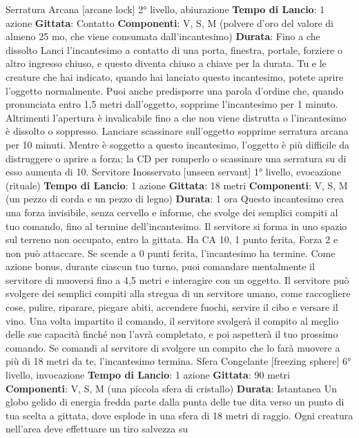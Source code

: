 \begin{multicols}{2}
Serratura Arcana
[arcane lock]
2° livello, abiurazione
\textbf{Tempo di Lancio}: 1 azione
\textbf{Gittata}: Contatto
\textbf{Componenti}: V, S, M (polvere d’oro del valore di
almeno 25 mo, che viene consumata dall’incantesimo)
\textbf{Durata}: Fino a che dissolto
Lanci l’incantesimo a contatto di una porta, finestra,
portale, forziere o altro ingresso chiuso, e questo
diventa chiuso a chiave per la durata. Tu e le creature
che hai indicato, quando hai lanciato questo
incantesimo, potete aprire l’oggetto normalmente. Puoi
anche predisporre una parola d’ordine che, quando
pronunciata entro 1,5 metri dall’oggetto, sopprime
l’incantesimo per 1 minuto. Altrimenti l’apertura è
invalicabile fino a che non viene distrutta o
l’incantesimo è dissolto o soppresso. Lanciare
scassinare sull’oggetto sopprime serratura arcana per
10 minuti.
Mentre è soggetto a questo incantesimo, l’oggetto è più
difficile da distruggere o aprire a forza; la CD per
romperlo o scassinare una serratura su di esso
aumenta di 10.
Servitore Inosservato
[unseen servant]
1° livello, evocazione (rituale)
\textbf{Tempo di Lancio}: 1 azione
\textbf{Gittata}: 18 metri
\textbf{Componenti}: V, S, M (un pezzo di corda e un pezzo di
legno)
\textbf{Durata}: 1 ora
Questo incantesimo crea una forza invisibile, senza
cervello e informe, che svolge dei semplici compiti al
tuo comando, fino al termine dell’incantesimo. Il
servitore si forma in uno spazio sul terreno non
occupato, entro la gittata. Ha CA 10, 1 punto ferita,
Forza 2 e non può attaccare. Se scende a 0 punti ferita,
l’incantesimo ha termine.
Come azione bonus, durante ciascun tuo turno, puoi
comandare mentalmente il servitore di muoversi fino a
4,5 metri e interagire con un oggetto. Il servitore può
svolgere dei semplici compiti alla stregua di un servitore
umano, come raccogliere cose, pulire, riparare, piegare
abiti, accendere fuochi, servire il cibo e versare il vino.
Una volta impartito il comando, il servitore svolgerà il
compito al meglio delle sue capacità finché non l’avrà
completato, e poi aspetterà il tuo prossimo comando.
Se comandi al servitore di svolgere un compito che lo
farà muovere a più di 18 metri da te, l’incantesimo
termina.
Sfera Congelante
[freezing sphere]
6° livello, invocazione
\textbf{Tempo di Lancio}: 1 azione
\textbf{Gittata}: 90 metri
\textbf{Componenti}: V, S, M (una piccola sfera di cristallo)
\textbf{Durata}: Istantanea
Un globo gelido di energia fredda parte dalla punta
delle tue dita verso un punto di tua scelta a gittata, dove
esplode in una sfera di 18 metri di raggio. Ogni creatura
nell’area deve effettuare un tiro salvezza su

\end{multicols}

